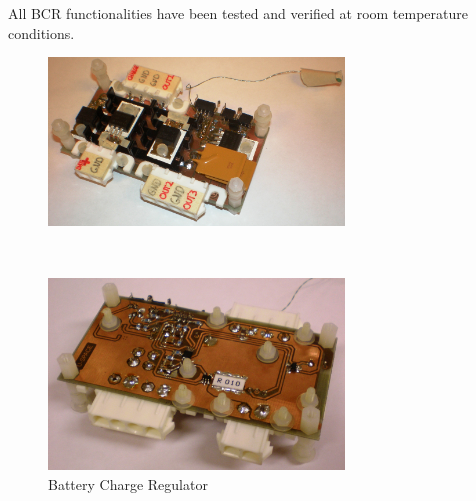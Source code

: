 %
All \ac{BCR} functionalities have been tested and verified at room temperature conditions.
%
%
%
\begin{figure}[H]
\begin{minipage}[t]{\linewidth}
\centering
\includegraphics[width=0.7\textwidth]{figures/fig_BCR_top}
\end{minipage}
\\[1mm]
\begin{minipage}[t]{\linewidth}
\centering
\includegraphics[width=0.7\textwidth]{figures/fig_BCR_bottom}
\end{minipage}
\caption{Battery Charge Regulator}
\label{fig:BCR_top_bottom}
\end{figure}
%
